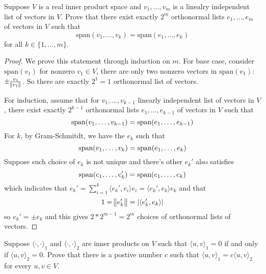 \documentclass{extarticle}
\begin{document}
\begin{problem}{14}
    Suppose \(V\) is a real inner product space and \(v_1, \ldots, v_m\) is a linealry independent list of 
    vectors in \(V\). Prove that there exist exactly \(2^m\) orthonormal lists \(e_1, \ldots, e_m\) of 
    vectors in \(V\) such that 
    \[\text{span}(v_1, \ldots, v_k)  = \text{span}(e_1, \ldots, e_k)\]
    for all \(k \in \{1, \ldots, m\}\).
\end{problem}

\begin{proof}
We prove this statement through induction on \(m\). For base case, consider \(\text{span}(v_1)\) for 
nonzero \(v_1 \in V\), there are only two nonzero vectors in \(\text{span}(v_1)\): \(\pm \frac{v_1}{\norm{v_1}}\). 
So there are exactly \(2^1 = 1\) orthonormal list of vectors. 

For induction, assume that for \(v_1, \ldots, v_{k-1}\) linearly independent list of vectors in \(V\), 
there exist exactly \(2^{k-1}\) orthonormal lists \(e_1, \ldots, e_{k-1}\) of vectors in \(V\) such that 
\[\text{span} (v_1, \ldots, v_{k-1}) = \text{span} (e_1, \ldots, e_{k-1})\]
For \(k\), by Gram-Schmitdt, we have the \(e_k\) such that 
\[\text{span} (v_1, \ldots, v_k) = \text{span} (e_1, \ldots, e_k)\]
Suppose such choice of \(e_k\) is not unique and there's other \(e_k'\) also satisfies 
\[\text{span}(e_1, \ldots, e_k') = \text{span}(e_1, \ldots, e_k)\]
which indicates that \(e_k' = \sum_{i=1}^{k} \langle e_k',e_i \rangle e_i = \langle e_k',e_k \rangle e_k\) and that 
\[1 = \norm{e_k'} = |\langle e_k', e_k \rangle|\]
so \(e_k' = \pm e_k\) and this gives \(2 * 2^{m-1} = 2^m\) choices of orthonormal lists of vectors.
\end{proof}


\begin{problem}{15}
    Suppose \(\langle \cdot,\cdot \rangle_1\) and \(\langle \cdot,\cdot \rangle_2\) are inner products on 
    \(V\) such that \(\langle u,v \rangle_1 = 0\) if and only if \(\langle u,v \rangle_2 = 0\). Prove that 
    there is a postive number \(c\) such that \(\langle u,v \rangle_1 = c \langle u,v \rangle_2\) for 
    every \(u, v \in V\).
\end{problem}
\end{document}
